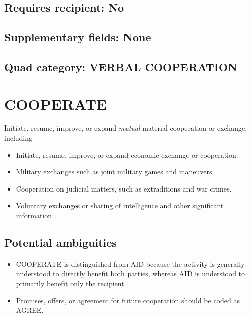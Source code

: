\documentclass[11pt]{report}
\newcommand{\plcat}[1]{\textsf{#1}}
\newcommand{\ti}[1]{\textit{#1}}
\begin{document}
\subsection{Requires recipient: No}

\subsection{Supplementary fields: None}

\subsection{Quad category: VERBAL COOPERATION}


\newpage

\section{COOPERATE}

Initiate, resume, improve, or expand \ti{mutual} material cooperation or exchange, including

\begin{itemize}
\item Initiate, resume, improve, or expand economic exchange or cooperation.

\item Military exchanges such as joint military games and maneuvers.

\item Cooperation on judicial matters, such as extraditions and war crimes.

\item Voluntary exchanges or sharing of intelligence and other significant information .

\end{itemize}

\subsection{Potential ambiguities}

\begin{itemize}
\item \plcat{COOPERATE} is distinguished from \plcat{AID} because the activity is generally understood to directly benefit both parties, whereas  \plcat{AID} is understood to primarily benefit only the recipient.
\item Promises, offers, or agreement for future cooperation should be coded as \plcat{AGREE}.
\end{itemize}
\end{document}
